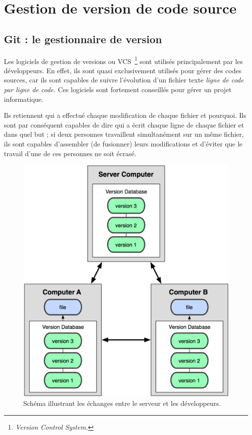 \chapter{Gestion de version de code source}

\section{Git : le gestionnaire de version}

Les logiciels de gestion de versions ou VCS\, \footnote{\emph{Version Control
System.}} sont utilisés principalement par les développeurs. En effet, ils sont
quasi exclusivement utilisés pour gérer des codes sources, car ils sont
capables de suivre l’évolution d’un fichier texte \emph{ligne de code par ligne de
code.} Ces logiciels sont fortement conseillés pour gérer un projet
informatique.

Ils retiennent qui a effectué chaque modification de chaque fichier et
pourquoi. Ils sont par conséquent capables de dire qui a écrit chaque ligne de
chaque fichier et dans quel but ; si deux personnes travaillent simultanément
sur un même fichier, ils sont capables d’assembler (de fusionner) leurs
modifications et d’éviter que le travail d’une de ces personnes ne soit écrasé.

\begin{figure}
\begin{center}
\includegraphics[scale=0.8]{images/workflow.png}
\caption{Schéma illustrant les échanges entre le serveur et les développeurs.}
\end{center}
\end{figure}

